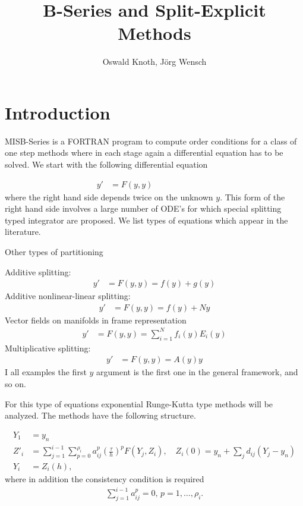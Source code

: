 \documentclass[english,unicode]{article}
\author{Oswald Knoth, J\"org Wensch}
\title{B-Series and Split-Explicit Methods}
\def\Si{\sum_{j=1}^{i-1}a_{ij}^{[0]}}
\begin{document}
\maketitle


\section{Introduction}

MISB-Series is a FORTRAN program to compute order conditions for a class of one step methods where in each stage again a differential equation has to be solved. We start with the following differential equation

\begin{align*}
y' & = F(y,y) \hspace{3cm} 
\end{align*}
where the right hand side depends twice on the unknown $y$. This form of the right hand side involves a large number of ODE's for which special splitting typed integrator are proposed. We list types of equations which appear in the literature.

\noindent Other types of partitioning 

\noindent Additive splitting:
\begin{align*}
y' & = F(y,y) =f(y)+g(y)
\end{align*}
Additive nonlinear-linear splitting:
\begin{align*}
y' & = F(y,y) = f(y)+Ny
\end{align*}
Vector fields on manifolds in frame representation
\begin{align*}
y' &=F (y,y)=\sum_{i=1}^Nf_i(y)E_i(y)
\end{align*}
Multiplicative splitting:
\begin{align*}
y' &=F (y,y)=A(y)y
\end{align*}
I all examples the first $y$ argument is the first one in the general framework, and so on. 

For this type of equations exponential Runge-Kutta type methods will be analyzed. The methods have the following structure.

\begin{align*}
Y_1 & = y_n\\
Z'_i &=\sum_{j=1}^{i-1}\sum_{p=0}^{\rho_i}a_{ij}^p\left(\frac{\tau}{h}\right)^p F(Y_j,Z_i),\quad Z_i(0)=y_n+\sum_jd_{ij}(Y_j-y_n)\\
Y_i &  =Z_i(h),
\end{align*}
where in addition the consistency condition is required
\begin{align*}
\sum_{j=1}^{i-1} a_{ij}^p=0,\, p=1,\ldots,\rho_i.
\end{align*}
\end{document}
